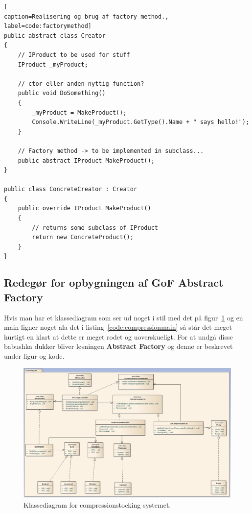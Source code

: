 \begin{lstlisting}[
caption=Realisering og brug af factory method.,
label=code:factorymethod]
public abstract class Creator
{
	// IProduct to be used for stuff
	IProduct _myProduct;
	
	// ctor eller anden nyttig function?
	public void DoSomething()
	{
		_myProduct = MakeProduct();
		Console.WriteLine(_myProduct.GetType().Name + " says hello!");
	}

	// Factory method -> to be implemented in subclass...
	public abstract IProduct MakeProduct();
}

public class ConcreteCreator : Creator
{
	public override IProduct MakeProduct()
	{
		// returns some subclass of IProduct
		return new ConcreteProduct();
	}
}
\end{lstlisting}

\subsection{Redegør for opbygningen af GoF Abstract Factory}
Hvis man har et klassediagram som ser ud noget i stil med det på figur~\ref{fig:compressionstockings_classdiagram} og en main ligner noget ala det i listing~\ref{code:compressionmain} så står det meget hurtigt en klart at dette er meget rodet og uoverskueligt. For at undgå disse babushka dukker bliver løsningen \textbf{Abstract Factory} og denne er beskrevet under figur og kode.

\begin{figure}[H]
	\centering
	\includegraphics[width=0.9\linewidth]{figs/compressionstockings_classdiagram}
	\caption{Klassediagram for compressionstocking systemet.}
	\label{fig:compressionstockings_classdiagram}
\end{figure}

